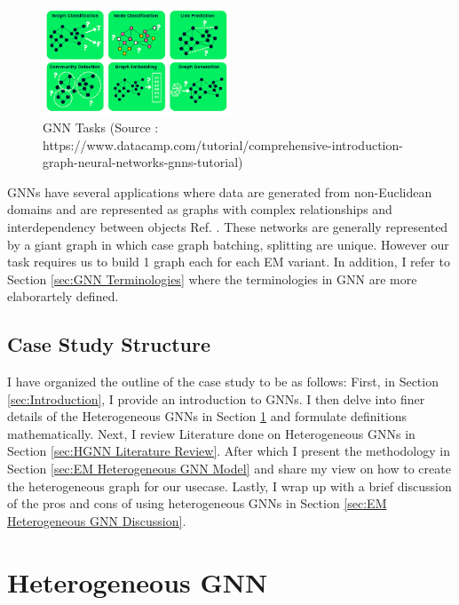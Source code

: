 \documentclass{report} %
\begin{document}
\begin{figure}[H]
    \centering
    \includegraphics[width=0.5\textwidth]{./ReportImages/GraphTasks.png} 
    \caption{\ac{GNN} Tasks (Source : https://www.datacamp.com/tutorial/comprehensive-introduction-graph-neural-networks-gnns-tutorial) }
    \label{fig:GNN Predictions}
\end{figure}

\ac{GNN}s have several applications where data are generated from non-Euclidean domains and are represented as graphs with complex relationships 
and interdependency between objects Ref. \cite{GNN-2019}.
These networks are generally represented by a giant graph in which case graph batching, splitting are unique. 
However our task requires us to build 1 graph each for each \ac{EM} variant.
In addition, I refer to Section \ref{sec:GNN Terminologies} where the terminologies in \ac{GNN} are more elaborartely defined.

\subsection{Case Study Structure}\label{subsec:Case Study Structure}
I have organized the outline of the case study to be as follows:
First, in Section \ref{sec:Introduction}, I provide an introduction to \ac{GNN}s.
I then delve into finer details of the Heterogeneous \ac{GNN}s in Section \ref{sec:Heterogeneous GNN} and formulate definitions mathematically.
Next, I review Literature done on Heterogeneous \ac{GNN}s in Section \ref{sec:HGNN Literature Review}.
After which I present the methodology in Section \ref{sec:EM Heterogeneous GNN Model} and share my view on how to create the heterogeneous graph for our usecase.
Lastly, I wrap up with a brief discussion of the pros and cons of using heterogeneous \ac{GNN}s in Section \ref{sec:EM Heterogeneous GNN Discussion}.

\section{Heterogeneous GNN}\label{sec:Heterogeneous GNN}
\end{document}
